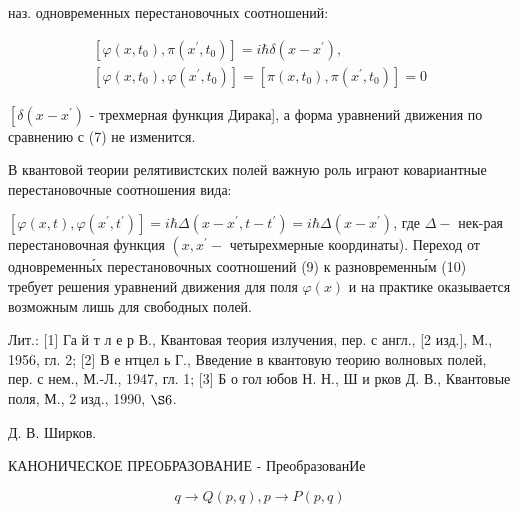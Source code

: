 \documentclass[10pt]{article}
\begin{document}
наз. одновременных перестановочных соотношений:



\[

\begin{gathered}

{\left[\varphi\left(x, t_{0}\right), \pi\left(x^{\prime}, t_{0}\right)\right]=i \hbar \delta\left(x-x^{\prime}\right),} \\

{\left[\varphi\left(x, t_{0}\right), \varphi\left(x^{\prime}, t_{0}\right)\right]=\left[\pi\left(x, t_{0}\right), \pi\left(x^{\prime}, t_{0}\right)\right]=0}

\end{gathered}

\]



$\left[\delta\left(x-x^{\prime}\right)\right.$ - трехмерная функция Дирака], а форма уравнений движения по сравнению с (7) не изменится.



В квантовой теории релятивистских полей важную роль играют ковариантные перестановочные соотношения вида:



$\left[\varphi(x, t), \varphi\left(x^{\prime}, t^{\prime}\right)\right]=i \hbar \Delta\left(x-x^{\prime}, t-t^{\prime}\right)=i \hbar \Delta\left(x-x^{\prime}\right)$, где $\Delta-$ нек-рая перестановочная функция $\left(x, x^{\prime}-\right.$ четырехмерные координаты). Переход от одновременны́х перестановочных соотношений (9) к разновременны́м (10) требует решения уравнений движения для поля $\varphi(x)$ и на практике оказывается возможным лишь для свободных полей.



Лит.: [1] Га й т л е р В., Квантовая теория излучения, пер. с англ., [2 изд.], М., 1956, гл. 2; [2] В е нтцел ь Г., Введение в квантовую теорию волновых полей, пер. с нем., М.-Л., 1947, гл. 1; [3] Б о гол юбов Н. Н., Ш и рков Д. В., Квантовые поля, М., 2 изд., 1990, $\S 6$.



Д. В. Ширков.



КАНОНИЧЕСКОЕ ПРЕОБРАЗОВАНИЕ - ПреобразованИе



\[

q \rightarrow Q(p, q), p \rightarrow P(p, q)

\]
\end{document}
